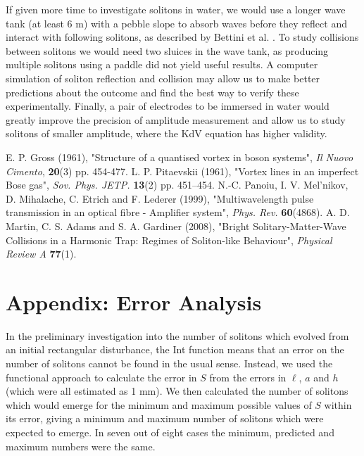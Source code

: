 \documentclass[10pt, twocolumn]{revtex4}    %
\begin{document}
If given more time to investigate solitons in water, we would use a longer wave tank (at least 6 m) with a pebble slope to absorb waves before they reflect and interact with following solitons, as described by Bettini et al. \cite{UGlab}. To study collisions between solitons we would need two sluices in the wave tank, as producing multiple solitons using a paddle did not yield useful results. A computer simulation of soliton reflection and collision may allow us to make better predictions about the outcome and find the best way to verify these experimentally. Finally, a pair of electrodes to be immersed in water would greatly improve the precision of amplitude measurement and allow us to study solitons of smaller amplitude, where the KdV equation has higher validity. 


\begin{thebibliography}{}

 E. P. Gross (1961), "Structure of a quantised vortex in boson systems", \textit{Il Nuovo Cimento}, \textbf{20}(3) pp. 454-477. 
  L. P. Pitaevskii (1961), "Vortex lines in an imperfect Bose gas", \textit{Sov. Phys. JETP.} \textbf{13}(2) pp. 451–454.
 N.-C. Panoiu, I. V. Mel’nikov, D. Mihalache, C. Etrich and F. Lederer (1999), "Multiwavelength pulse transmission in an optical fibre - Amplifier system", \textit{Phys. Rev.} \textbf{60}(4868).
 A. D. Martin, C. S. Adams and S. A. Gardiner (2008), "Bright Solitary-Matter-Wave Collisions in a Harmonic Trap: Regimes of Soliton-like Behaviour", \textit{Physical Review A} \textbf{77}(1). 

\end{thebibliography} 


\section{Appendix: Error Analysis} \label{Errors}

In the preliminary investigation into the number of solitons which evolved from an initial rectangular disturbance, the Int function means that an error on the number of solitons cannot be found in the usual sense. Instead, we used the functional approach \cite{Hughes} to calculate the error in $S$ from the errors in $\ell$, $a$ and $h$ (which were all estimated as 1 mm). We then calculated the number of solitons which would emerge for the minimum and maximum possible values of $S$ within its error, giving a minimum and maximum number of solitons which were expected to emerge. In seven out of eight cases the minimum, predicted and maximum numbers were the same. 
\end{document}
